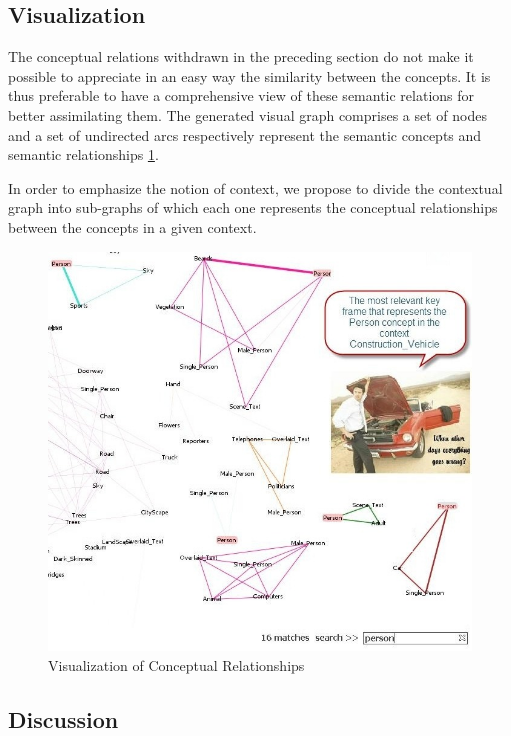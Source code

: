	\subsection{Visualization}

	The conceptual relations withdrawn in the preceding section do not make it possible 
	to appreciate in an easy way the similarity between the concepts. It is thus preferable
	to have a comprehensive view of these semantic relations for better assimilating them.  
	The generated visual graph comprises a set of nodes and a set of undirected arcs  respectively
	represent the semantic concepts and semantic relationships \ref{annotation_tool2}. 

	In order to emphasize the notion of context, we propose to divide the contextual graph 
	into sub-graphs of which each one represents the conceptual relationships between the concepts in a given context.
	\begin{figure}[ht!]	
		\centering
		\includegraphics[scale=0.5]{graphics/annotation_tool2}
		\caption{Visualization of Conceptual Relationships}
		\label{annotation_tool2}
	\end{figure}

	\subsection{Discussion}

